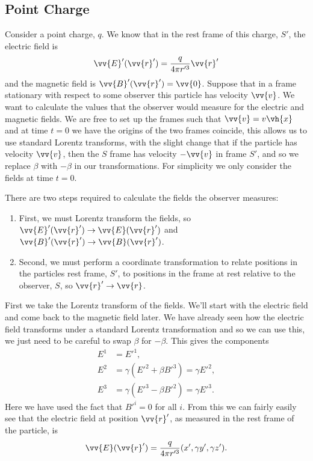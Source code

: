 \subsection{Point Charge}
Consider a point charge, \(q\).
We know that in the rest frame of this charge, \(S'\), the electric field is
\begin{equation}
    \vv{E}'(\vv{r}') = \frac{q}{4\pi r'^3} \vv{r}'
\end{equation}
and the magnetic field is \(\vv{B}'(\vv{r}') = \vv{0}\).
Suppose that in a frame stationary with respect to some observer this particle has velocity \(\vv{v}\).
We want to calculate the values that the observer would measure for the electric and magnetic fields.
We are free to set up the frames such that \(\vv{v} = v\vh{x}\) and at time \(t = 0\) we have the origins of the two frames coincide, this allows us to use standard Lorentz transforms, with the slight change that if the particle has velocity \(\vv{v}\), then the \(S\) frame has velocity \(-\vv{v}\) in frame \(S'\), and so we replace \(\beta\) with \(-\beta\) in our transformations.
For simplicity we only consider the fields at time \(t = 0\).

There are two steps required to calculate the fields the observer measures:
\begin{enumerate}
    \item First, we must Lorentz transform the fields, so \(\vv{E}'(\vv{r}') \to \vv{E}(\vv{r}')\) and \(\vv{B}'(\vv{r}') \to \vv{B}(\vv{r}')\).
    \item Second, we must perform a coordinate transformation to relate positions in the particles rest frame, \(S'\), to positions in the frame at rest relative to the observer, \(S\), so \(\vv{r}' \to \vv{r}\).
\end{enumerate}

First we take the Lorentz transform of the fields.
We'll start with the electric field and come back to the magnetic field later.
We have already seen how the electric field transforms under a standard Lorentz transformation and so we can use this, we just need to be careful to swap \(\beta\) for \(-\beta\).
This gives the components
\begin{align}
    E^1 &= E'^1,\\
    E^2 &= \gamma(E'^2 + \beta B'^3) = \gamma E'^2,\\
    E^3 &= \gamma(E'^3 - \beta B'^2) = \gamma E'^3.
\end{align}
Here we have used the fact that \(B'^i = 0\) for all \(i\).
From this we can fairly easily see that the electric field at position \(\vv{r}'\), as measured in the rest frame of the particle, is
\begin{equation}
    \vv{E}(\vv{r}') = \frac{q}{4\pi r'^3}(x', \gamma y', \gamma z').
\end{equation}

